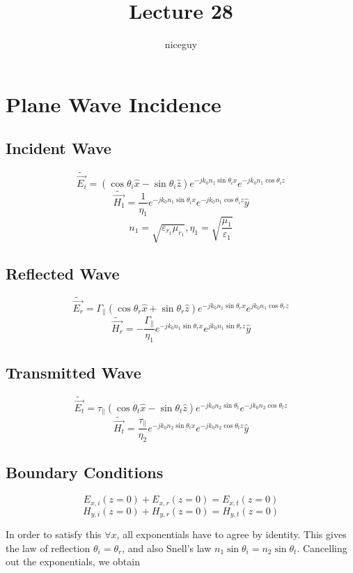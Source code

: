 \documentclass[12pt]{article}
\title{Lecture 28}
\author{niceguy}
\begin{document}
\maketitle

\section{Plane Wave Incidence}

\subsection{Incident Wave}

$$\tilde{\vec{E_i}} = (\cos\theta_i\hat x - \sin\theta_i\hat z)e^{-jk_0n_1\sin\theta_ix}e^{-jk_0n_1\cos\theta_iz}$$
$$\tilde{\vec{H_1}} = \frac{1}{\eta_1}e^{-jk_0n_1\sin\theta_ix}e^{-jk_0n_1\cos\theta_iz}\hat y$$
$$n_1 = \sqrt{\varepsilon_{r_1}\mu_{r_1}}, \eta_1 = \sqrt{\frac{\mu_1}{\varepsilon_1}}$$

\subsection{Reflected Wave}

$$\tilde{\vec{E_r}} = \Gamma_\parallel (\cos\theta_r\hat x + \sin\theta_r\hat z)e^{-jk_0n_1\sin\theta_rx}e^{jk_0n_1\cos\theta_rz}$$
$$\tilde{\vec{H_r}} = -\frac{\Gamma_\parallel}{\eta_1}e^{-jk_0n_1\sin\theta_rx}e^{jk_0n_1\sin\theta_rz}\hat y$$

\subsection{Transmitted Wave}

$$\tilde{\vec{E_t}} = \tau_\parallel(\cos\theta_t\hat x - \sin\theta_t\hat z)e^{-jk_0n_2\sin\theta_t}e^{-jk_0n_2\cos\theta_tz}$$
$$\tilde{\vec{H_t}} = \frac{\tau_\parallel}{\eta_2}e^{-jk_0n_2\sin\theta_tx}e^{-jk_0n_2\cos\theta_tz}\hat y$$

\subsection{Boundary Conditions}

$$E_{x,i}(z=0) + E_{x,r}(z=0) = E_{x,t}(z=0)$$
$$H_{y,i}(z=0) + H_{y,r}(z=0) = H_{y,t}(z=0)$$

In order to satisfy this $\forall x$, all exponentials have to agree by identity. This gives the law of reflection $\theta_i = \theta_r$, and also Snell's law $n_1\sin\theta_i = n_2\sin\theta_t$. Cancelling out the exponentials, we obtain
\end{document}
